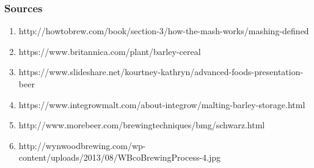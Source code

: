 \documentclass{beamer}
\begin{document}
\begin{frame}
  \frametitle{Sources}
  \begin{enumerate}
  \item http://howtobrew.com/book/section-3/how-the-mash-works/mashing-defined
  \item https://www.britannica.com/plant/barley-cereal
  \item https://www.slideshare.net/kourtney-kathryn/advanced-foods-presentation-beer
  \item https://www.integrowmalt.com/about-integrow/malting-barley-storage.html
  \item http://www.morebeer.com/brewingtechniques/bmg/schwarz.html
  \item http://wynwoodbrewing.com/wp-content/uploads/2013/08/WBcoBrewingProcess-4.jpg
  \end{enumerate}
  \end{frame}
\end{document}
